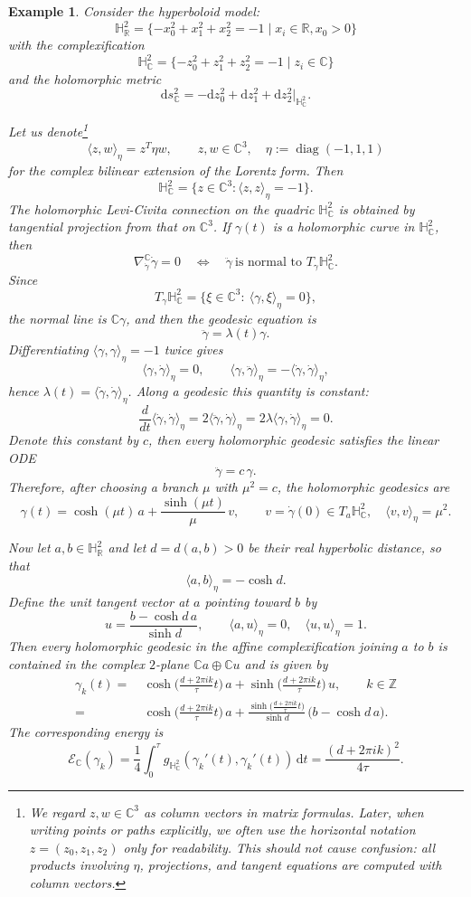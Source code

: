 \documentclass[11pt]{amsart}
\theoremstyle{plain}
\newtheorem{eg}[thm]{Example}
\theoremstyle{definition}
\newcommand{\R}{\mathbb{R}}
\newcommand{\C}{\mathbb{C}}
\newcommand{\Z}{\mathbb Z}
\newcommand{\dd}{\mathrm d}
\newcommand{\HH}{\mathbb{H}}
\DeclareMathOperator{\diag}{diag}
\begin{document}
\smallskip
\begin{eg}\label{eg:H^2-PL} Consider the hyperboloid model: 
\[\HH_{\R}^2=\{-x_0^2+x_1^2+x_2^2=-1\mid x_i\in\R, x_0>0\}\]
with the complexification 
\[\HH_{\C}^2=\{-z_0^2+z_1^2+z_2^2=-1\mid z_i\in\C\}\]
and the holomorphic metric
\[\dd s_{\C}^2=-\dd z_0^2+\dd z_1^2+\dd z_2^2\big|_{\HH_{\C}^2}.\]

Let us denote\footnote{We regard $z,w\in\mathbb C^3$ as column vectors in matrix formulas.  Later,
when writing points or paths explicitly, we often use the horizontal notation
$z=(z_0,z_1,z_2)$ only for readability.  This should not cause confusion:
all products involving $\eta$, projections, and tangent equations are computed with column vectors.}
\[\langle z,w\rangle_{\eta}=z^T\eta w, \qquad z,w\in \C^3, \quad \eta:=\diag(-1,1,1)
\]
for the complex bilinear extension of the Lorentz form. Then
\[\HH_{\C}^2=\{z\in\C^3: \langle z, z\rangle_\eta=-1\}.\]
The holomorphic Levi-Civita connection on the quadric $\HH_{\C}^2$ is obtained by tangential projection from that on  $\C^3$. If $\gamma(t)$ is a holomorphic curve in $\HH_{\C}^2$, then
\[
\nabla^{\C}_{\dot\gamma}\dot\gamma=0
\quad\Longleftrightarrow\quad
\ddot\gamma \ \text{is normal to } T_{\gamma}\HH_{\C}^2 .
\]
Since
\[
T_{\gamma}\HH_{\C}^2=\{\xi\in \C^3:\ \langle\gamma,\xi\rangle_{\eta}=0\},
\]
the normal line is $\C\gamma$, and then the geodesic equation is
\[
\ddot\gamma=\lambda(t)\gamma .
\]
Differentiating $\langle\gamma,\gamma\rangle_{\eta}=-1$ twice gives
\[
\langle\gamma,\dot\gamma\rangle_{\eta}=0,
\qquad
\langle\gamma,\ddot\gamma\rangle_{\eta}=-\langle\dot\gamma,\dot\gamma\rangle_{\eta},
\]
hence $\lambda(t)=\langle\dot\gamma,\dot\gamma\rangle_{\eta}$. Along a geodesic this quantity is constant:
\[
\frac{d}{dt}\langle \dot\gamma,\dot\gamma\rangle_\eta
=2\langle \ddot\gamma,\dot\gamma\rangle_\eta
=2\lambda \langle \gamma,\dot\gamma\rangle_\eta=0.
\]
Denote this constant by $c$, then every holomorphic geodesic satisfies the linear ODE
\[
\ddot\gamma=c\,\gamma .
\]
Therefore, after choosing a branch $\mu$ with $\mu^2=c$, the holomorphic geodesics are
\[
\gamma(t)=\cosh(\mu t)\,a+\frac{\sinh(\mu t)}{\mu}\,v,
\qquad
v=\dot\gamma(0)\in T_a\HH_{\C}^2,\quad \langle v,v\rangle_{\eta}=\mu^2 .
\]

Now let $a,b\in \HH_{\R}^2$ and let $d=d(a,b)>0$ be their real hyperbolic distance, so that
\[
\langle a,b\rangle_{\eta}=-\cosh d.
\]
Define the unit tangent vector at $a$ pointing toward $b$ by
\[
u=\frac{b-\cosh d\, a}{\sinh d},
\qquad
\langle a,u\rangle_{\eta}=0,\quad \langle u,u\rangle_{\eta}=1.
\]
Then every holomorphic geodesic in the affine complexification joining $a$ to $b$ is contained in the complex $2$-plane $\C a\oplus \C u$ and is given by
\begin{align*}
\gamma_k(t)
=~&\cosh\!\Big(\frac{d+2\pi i k}{\tau}t\Big)\,a
+\sinh\!\Big(\frac{d+2\pi i k}{\tau}t\Big)\,u,
\qquad k\in\Z \\
=~&\cosh\!\Big(\frac{d+2\pi i k}{\tau}t\Big)\,a
+\frac{\sinh\!\big(\frac{d+2\pi i k}{\tau}t\big)}{\sinh d}\,
\bigl(b-\cosh d\,a\bigr).
\end{align*}
The corresponding energy is
\[
\mathcal E_{\C}(\gamma_{k})
=\frac{1}{4}\int_0^{\tau}g_{\HH_{\C}^2}(\gamma_k'(t),\gamma_k'(t))\,\dd t
=\frac{(d+2\pi i k)^2}{4\tau}.
\]


\end{eg}
\end{document}
